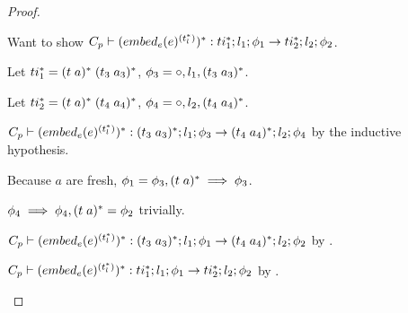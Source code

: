 \begin{proof}
\begin{enumerate}
        Want to show $C_p \vdash (\embed[e]{e}^{(t_l^{*})})^{*} : ti_1^{*};l_1;\phi_1 \rightarrow ti_2^{*};l_2;\phi_2$.

        Let $ti_1^{*} = \ti{t}{a}^{*}\; \ti{t_3}{a_3}^{*}$, $\phi_3 = \circ,l_1,\ti{t_3}{a_3}^{*}$.

        Let $ti_2^{*} = \ti{t}{a}^{*}\; \ti{t_4}{a_4}^{*}$, $\phi_4 = \circ,l_2,\ti{t_4}{a_4}^{*}$.


        $C_p \vdash (\embed[e]{e}^{(t_l^{*})})^{*} : \ti{t_3}{a_3}^{*};l_1;\phi_3 \rightarrow \ti{t_4}{a_4}^{*};l_2;\phi_4$ by the inductive hypothesis.

        Because $a$ are fresh, $\phi_1 = \phi_3,\ti{t}{a}^{*} \implies \phi_3$.


        $\phi_4 \implies \phi_4,\ti{t}{a}^{*} = \phi_2$ trivially.

        $C_p \vdash (\embed[e]{e}^{(t_l^{*})})^{*} : \ti{t_3}{a_3}^{*};l_1;\phi_1 \rightarrow \ti{t_4}{a_4}^{*};l_2;\phi_2$ by .

        $C_p \vdash (\embed[e]{e}^{(t_l^{*})})^{*} : ti_1^{*};l_1;\phi_1 \rightarrow ti_2^{*};l_2;\phi_2$ by .

    \end{enumerate}
\end{proof}

